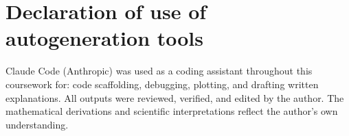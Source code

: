 \documentclass[11pt,a4paper]{article}
\begin{document}
\section*{Declaration of use of autogeneration tools}

Claude Code (Anthropic) was used as a coding assistant throughout this coursework for: code scaffolding, debugging, plotting, and drafting written explanations. All outputs were reviewed, verified, and edited by the author. The mathematical derivations and scientific interpretations reflect the author's own understanding.
\end{document}
